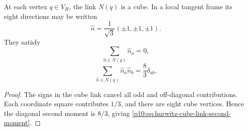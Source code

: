 \documentclass[12pt,a4paper]{article}
\begin{document}
\begin{lemma}
\label{p10:lem:hurwitz-cube-link-second-moment}
At each vertex \(q\in V_H\), the link \(N(q)\) is a cube.  In a local tangent frame its eight directions may be written
\begin{equation}
\label{p10:eq:hurwitz-cube-link-directions}
\hat n=\frac1{\sqrt3}(\pm1,\pm1,\pm1).
\end{equation}
They satisfy
\begin{equation}
\label{p10:eq:hurwitz-cube-link-moment-zero}
\sum_{\hat n\in N(q)}\hat n_a=0,
\end{equation}
\begin{equation}
\label{p10:eq:hurwitz-cube-link-second-moment}
\sum_{\hat n\in N(q)}\hat n_a\hat n_b=\frac83\delta_{ab}.
\end{equation}
\end{lemma}
\begin{proof}
The signs in the cube link cancel all odd and off-diagonal contributions.  Each coordinate square contributes \(1/3\), and there are eight cube vertices.  Hence the diagonal second moment is \(8/3\), giving \eqref{p10:eq:hurwitz-cube-link-second-moment}.
\end{proof}
\end{document}
